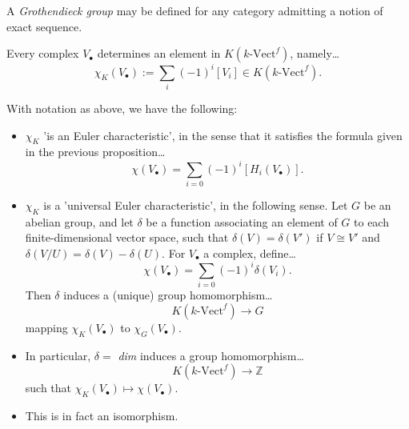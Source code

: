 \noindent A \emph{Grothendieck group} may be defined for any category admitting a notion of exact sequence. \newline

\noindent Every complex $V_{\bullet}$ determines an element in $K(k\textrm{-Vect}^f)$, namely\dots
$$\chi_K(V_{\bullet}) := \sum_i(-1)^i[V_i] \in K(k\textrm{-Vect}^f).$$

\begin{proposition}
With notation as above, we have the following:
\begin{itemize}
  \item $\chi_K$ 'is an Euler characteristic', in the sense that it satisfies the formula given
  in the previous proposition\dots
  $$\chi(V_{\bullet}) = \sum_{i=0}(-1)^{i}[H_i(V_{\bullet})].$$
  \item $\chi_K$ is a 'universal Euler characteristic', in the following sense. Let $G$ be an abelian group, and let $\delta$ be a function associating an element of $G$ to
  each finite-dimensional vector space, such that $\delta(V) = \delta(V')$ if $V \cong V'$ and $\delta(V/U) = \delta(V) - \delta(U).$ For $V_{\bullet}$
  a complex, define\dots
  $$\chi(V_{\bullet}) = \sum_{i=0}(-1)^{i}\delta(V_i).$$
  Then $\delta$ induces a (unique) group homomorphism\dots
  $$K(k\textrm{-Vect}^f) \rightarrow G$$
  mapping $\chi_K(V_{\bullet})$ to $\chi_G(V_{\bullet})$.
  \item In particular, $\delta =$ \emph{dim} induces a group homomorphism\dots
  $$K(k\textrm{-Vect}^f) \rightarrow \mathbb{Z}$$
  such that $\chi_K(V_{\bullet}) \mapsto \chi(V_{\bullet}).$
  \item This is in fact an isomorphism.
\end{itemize}
\end{proposition}